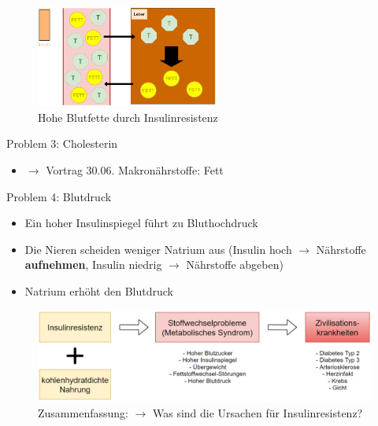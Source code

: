 \documentclass[xcolor=dvipsnames]{beamer}
\begin{document}
\begin{frame}[allowframebreaks]
        \begin{figure}
            \centering
            \includegraphics[width=6cm]{../images/problem_leber.png}
            \caption{Hohe Blutfette durch Insulinresistenz}
        \end{figure}

        \framebreak

        \begin{block}{Problem 3: Cholesterin}
            \begin{itemize}
                \setlength\itemsep{1em}
                \item $\rightarrow$ Vortrag 30.06. Makronährstoffe: Fett
            \end{itemize}
        \end{block}

        \framebreak

        \begin{block}{Problem 4: Blutdruck}
            \begin{itemize}
                \setlength\itemsep{1em}
                \item Ein hoher Insulinspiegel führt zu Bluthochdruck
                \item Die Nieren scheiden weniger Natrium aus (Insulin hoch $\rightarrow$ Nährstoffe \textbf{aufnehmen}, Insulin niedrig $\rightarrow$ Nährstoffe abgeben)
                \item Natrium erhöht den Blutdruck
            \end{itemize}
        \end{block}

        \framebreak

        \begin{figure}
            \centering
            \includegraphics[width=12cm]{../images/problem_zusammenfassung.png}
            \caption{Zusammenfassung: $\rightarrow$ Was sind die Ursachen für Insulinresistenz?}
        \end{figure}


\end{frame}
\end{document}
